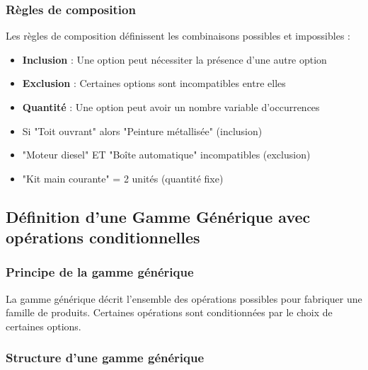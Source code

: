 \documentclass{article}
\begin{document}
\subsubsection{Règles de composition}

Les règles de composition définissent les combinaisons possibles et impossibles :

\begin{itemize}
    \item \textbf{Inclusion} : Une option peut nécessiter la présence d'une autre option
    \item \textbf{Exclusion} : Certaines options sont incompatibles entre elles
    \item \textbf{Quantité} : Une option peut avoir un nombre variable d'occurrences
\end{itemize}

\begin{tcolorbox}[colback=orangeclair, colframe=orange!70!black, title=Exemple de règles de composition]
\begin{itemize}
    \item Si "Toit ouvrant" alors "Peinture métallisée" (inclusion)
    \item "Moteur diesel" ET "Boîte automatique" incompatibles (exclusion)
    \item "Kit main courante" = 2 unités (quantité fixe)
\end{itemize}
\end{tcolorbox}

\subsection{Définition d'une Gamme Générique avec opérations conditionnelles}

\subsubsection{Principe de la gamme générique}

La gamme générique décrit l'ensemble des opérations possibles pour fabriquer une famille de produits. Certaines opérations sont conditionnées par le choix de certaines options.

\subsubsection{Structure d'une gamme générique}
\end{document}

